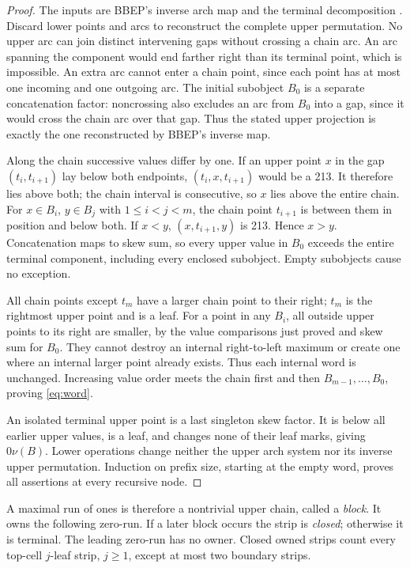 \documentclass[11pt]{amsart}
\numberwithin{equation}{section}
\theoremstyle{remark}\newtheorem{remark}[theorem]{Remark}
\begin{document}
\begin{proof}
The inputs are BBEP's inverse arch map \cite[Proposition 3.2, proof and equation (1)]{BBEP} and the terminal decomposition \cite[Proposition 3.4, cases (v)--(vi), Figure 8]{BBEP}. Discard lower points and arcs to reconstruct the complete upper permutation. No upper arc can join distinct intervening gaps without crossing a chain arc. An arc spanning the component would end farther right than its terminal point, which is impossible. An extra arc cannot enter a chain point, since each point has at most one incoming and one outgoing arc. The initial subobject $B_0$ is a separate concatenation factor: noncrossing also excludes an arc from $B_0$ into a gap, since it would cross the chain arc over that gap. Thus the stated upper projection is exactly the one reconstructed by BBEP's inverse map.

Along the chain successive values differ by one. If an upper point $x$ in the gap $(t_i,t_{i+1})$ lay below both endpoints, $(t_i,x,t_{i+1})$ would be a 213. It therefore lies above both; the chain interval is consecutive, so $x$ lies above the entire chain. For $x\in B_i$, $y\in B_j$ with $1\leq i<j<m$, the chain point $t_{i+1}$ is between them in position and below both. If $x<y$, $(x,t_{i+1},y)$ is 213. Hence $x>y$. Concatenation maps to skew sum, so every upper value in $B_0$ exceeds the entire terminal component, including every enclosed subobject. Empty subobjects cause no exception.

All chain points except $t_m$ have a larger chain point to their right; $t_m$ is the rightmost upper point and is a leaf. For a point in any $B_i$, all outside upper points to its right are smaller, by the value comparisons just proved and skew sum for $B_0$. They cannot destroy an internal right-to-left maximum or create one where an internal larger point already exists. Thus each internal word is unchanged. Increasing value order meets the chain first and then $B_{m-1},\ldots,B_0$, proving \eqref{eq:word}.

An isolated terminal upper point is a last singleton skew factor. It is below all earlier upper values, is a leaf, and changes none of their leaf marks, giving $0\nu(B)$. Lower operations change neither the upper arch system nor its inverse upper permutation. Induction on prefix size, starting at the empty word, proves all assertions at every recursive node.
\end{proof}

A maximal run of ones is therefore a nontrivial upper chain, called a \emph{block}. It owns the following zero-run. If a later block occurs the strip is \emph{closed}; otherwise it is terminal. The leading zero-run has no owner. Closed owned strips count every top-cell $j$-leaf strip, $j\geq1$, except at most two boundary strips.
\end{document}
